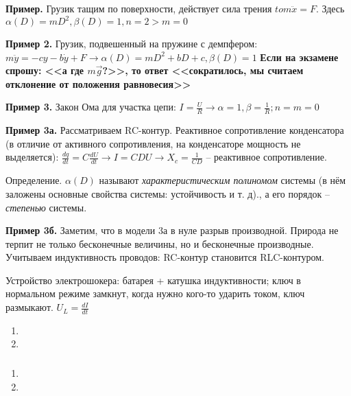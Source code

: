 \documentclass[main.tex]{subfiles}
\begin{document}
\textbf{Пример.} Грузик тащим по поверхности, действует сила трения $ to m \ddot x = F $. Здесь $ \alpha(D) = mD^2, \beta(D) = 1, n = 2 > m = 0 $

\textbf{Пример 2.} Грузик, подвешенный на пружине с демпфером: $ m \ddot y = - c y - b \dot y + F  \to \alpha(D) = mD^2 + bD + c, \beta(D) = 1 $  \textbf{Если на экзамене спрошу: <<а где $ m\vec{g} $?>>, то ответ <<сократилось, мы считаем отклонение от положения равновесия>>}

\textbf{Пример 3.} Закон Ома для участка цепи: $ I = \frac{U}{R} \to \alpha = 1, \beta = \frac{1}{R}; n = m = 0 $

\textbf{Пример 3а.} Рассматриваем RC-контур. Реактивное сопротивление конденсатора (в отличие от активного сопротивления, на конденсаторе мощность не выделяется): $ \frac{d q}{d t} = C \frac{d U}{d t} \to I = C DU \to X_c = \frac{1}{CD} $ -- реактивное сопротивление.

Определение. $ \alpha(D) $ называют \emph{характеристическим полиномом} системы (в нём заложены основные свойства системы: устойчивость и т. д)., а его порядок -- \emph{степенью} системы.

\textbf{Пример 3б.} Заметим, что в модели 3а в нуле разрыв производной. Природа не терпит не только бесконечные величины, но и бесконечные производные. %
Учитываем индуктивность проводов: RC-контур становится RLC-контуром.

Устройство электрошокера: батарея + катушка индуктивности; ключ в нормальном режиме замкнут, когда нужно кого-то ударить током, ключ размыкают. $ U_L = \frac{d I}{d t} $


\begin{enumerate}[noitemsep]
	\item
	\item
\end{enumerate}

\subsubsection{}

\begin{enumerate}[noitemsep]
	\item
	\item
\end{enumerate}
\end{document}
